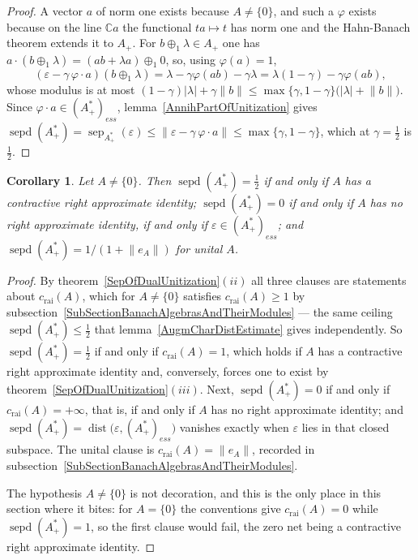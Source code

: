\documentclass[11pt]{article}
\theoremstyle{plain}
\newtheorem{corollary}[theorem]{Corollary}
\theoremstyle{definition}
\DeclareMathOperator{\dist}{dist}
\DeclareMathOperator{\sep}{sep}
\DeclareMathOperator{\sepd}{sepd}
\newcommand{\crai}{c_{\mathrm{rai}}}
\begin{document}
\begin{proof}
A vector $a$ of norm one exists because $A\neq \{0 \}$, and such a $\varphi$
exists because on the line $\mathbb{C}a$ the functional $ta\mapsto t$ has norm
one and the Hahn-Banach theorem extends it to $A_+$. For
$b\oplus_1\lambda\in A_+$ one has
$a\cdot(b\oplus_1\lambda)=(ab+\lambda a)\oplus_1 0$, so, using $\varphi(a)=1$,
\[
(\varepsilon-\gamma\,\varphi\cdot a)(b\oplus_1\lambda)
=\lambda-\gamma\varphi(ab)-\gamma\lambda
=\lambda(1-\gamma)-\gamma\varphi(ab),
\]
whose modulus is at most
$(1-\gamma)|\lambda|+\gamma\lVert b\rVert
\leq\max \{\gamma,1-\gamma \} \bigl(|\lambda|+\lVert b\rVert \bigr)$. Since
$\varphi\cdot a\in{(A_+^*)}_{ess}$, lemma~\ref{AnnihPartOfUnitization} gives
$\sepd(A_+^*)=\sep_{A_+^*}(\varepsilon)
\leq\lVert\varepsilon-\gamma\,\varphi\cdot a\rVert
\leq\max \{\gamma,1-\gamma \}$, which at $\gamma=\tfrac{1}{2}$ is
$\tfrac{1}{2}$.
\end{proof}

\begin{corollary}\label{SepOfDualUnitizationValues}
Let $A\neq \{0 \}$. Then $\sepd(A_+^*)=\tfrac{1}{2}$ if and only if $A$ has a
contractive right approximate identity; $\sepd(A_+^*)=0$ if and only if $A$ has
no right approximate identity, if and only if
$\varepsilon\in{(A_+^*)}_{ess}$; and $\sepd(A_+^*)=1/(1+\lVert e_A\rVert)$ for
unital $A$.
\end{corollary}

\begin{proof}
By theorem~\ref{SepOfDualUnitization}$(ii)$ all three clauses are statements
about $\crai(A)$, which for $A\neq \{0 \}$ satisfies $\crai(A)\geq 1$ by
subsection~\ref{SubSectionBanachAlgebrasAndTheirModules} --- the same ceiling
$\sepd(A_+^*)\leq\tfrac{1}{2}$ that lemma~\ref{AugmCharDistEstimate} gives
independently. So $\sepd(A_+^*)=\tfrac{1}{2}$ if and only if $\crai(A)=1$, which
holds if $A$ has a contractive right approximate identity and, conversely, forces
one to exist by theorem~\ref{SepOfDualUnitization}$(iii)$. Next,
$\sepd(A_+^*)=0$ if and only if $\crai(A)=+\infty$, that is, if and only if $A$
has no right approximate identity; and
$\sepd(A_+^*)=\dist \bigl(\varepsilon,{(A_+^*)}_{ess} \bigr)$ vanishes exactly
when $\varepsilon$ lies in that closed subspace. The unital clause is
$\crai(A)=\lVert e_A\rVert$, recorded in
subsection~\ref{SubSectionBanachAlgebrasAndTheirModules}.

The hypothesis $A\neq \{0 \}$ is not decoration, and this is the only place in
this section where it bites: for $A= \{0 \}$ the conventions give
$\crai(A)=0$ while $\sepd(A_+^*)=1$, so the first clause would fail, the zero net
being a contractive right approximate identity.
\end{proof}
\end{document}
